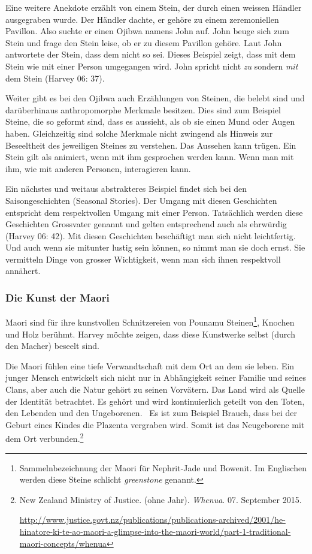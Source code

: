 Eine weitere Anekdote erzählt von einem Stein, der durch einen weissen Händler ausgegraben wurde. Der Händler dachte, er gehöre zu einem zeremoniellen Pavillon. Also suchte er einen Ojibwa namens John auf. John beuge sich zum Stein und frage den Stein leise, ob er zu diesem Pavillon gehöre. Laut John antwortete der Stein, dass dem nicht so sei. Dieses Beispiel zeigt, dass mit dem Stein wie mit einer Person umgegangen wird. John spricht nicht \emph{zu} sondern \emph{mit} dem Stein (Harvey 06: 37). 

Weiter gibt es bei den Ojibwa auch Erzählungen von Steinen, die belebt sind und darüberhinaus anthropomorphe Merkmale besitzen. Dies sind zum Beispiel Steine, die so geformt sind, dass es aussieht, als ob sie einen Mund oder Augen haben. Gleichzeitig sind solche Merkmale nicht zwingend als Hinweis zur Beseeltheit des jeweiligen Steines zu verstehen. Das Aussehen kann trügen. Ein Stein gilt als animiert, wenn mit ihm gesprochen werden kann. Wenn man mit ihm, wie mit anderen Personen, interagieren kann. 

Ein nächstes und weitaus abstrakteres Beispiel findet sich bei den Saisongeschichten (Seasonal Stories). Der Umgang mit diesen Geschichten entspricht dem respektvollen Umgang mit einer Person. Tatsächlich werden diese Geschichten Grossvater genannt und gelten entsprechend auch als ehrwürdig (Harvey 06: 42). Mit diesen Geschichten beschäftigt man sich nicht leichtfertig. Und auch wenn sie mitunter lustig sein können, so nimmt man sie doch ernst. Sie vermitteln Dinge von grosser Wichtigkeit, wenn man sich ihnen respektvoll annähert. 

\subsubsection*{Die Kunst der Maori}
Maori sind für ihre kunstvollen Schnitzereien von Pounamu Steinen\footnote{Sammelnbezeichnung der Maori für Nephrit-Jade und Bowenit. Im Englischen werden diese Steine schlicht \emph{greenstone} genannt.}, Knochen und Holz berühmt. Harvey möchte zeigen, dass diese Kunstwerke selbst (durch den Macher) beseelt sind.

Die Maori fühlen eine tiefe Verwandtschaft mit dem Ort an dem sie leben. Ein junger Mensch entwickelt sich nicht nur in Abhängigkeit seiner Familie und seines Clans, aber auch die Natur gehört zu seinen Vorvätern. Das Land wird als Quelle der Identität betrachtet. Es gehört und wird kontinuierlich geteilt von den Toten, den Lebenden und den Ungeborenen. ~Es ist zum Beispiel Brauch, dass bei der Geburt eines Kindes die Plazenta vergraben wird. Somit ist das Neugeborene mit dem Ort verbunden.\footnote{New Zealand Ministry of Justice. (ohne Jahr). \emph{Whenua}. 07. September 2015.

	\url{http://www.justice.govt.nz/publications/publications-archived/2001/he-hinatore-ki-te-ao-maori-a-glimpse-into-the-maori-world/part-1-traditional-maori-concepts/whenua}}

